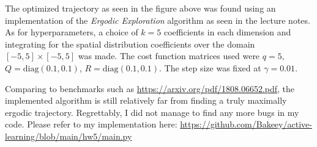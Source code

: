 The optimized trajectory as seen in the figure above was found using an implementation of the \textit{Ergodic Exploration} algorithm as seen in the lecture notes.
As for hyperparameters, a choice of $k=5$ coefficients in each dimension and integrating for the spatial distribution coefficients over the domain $[-5,5]\times[-5,5]$ was made. 
The cost function matrices used were $q=5$, $Q=\textrm{diag}(0.1,0.1)$, $R=\textrm{diag}(0.1,0.1)$. The step size was fixed at $\gamma = 0.01.$

Comparing to benchmarks such as \url{https://arxiv.org/pdf/1808.06652.pdf}, the implemented algorithm is still relatively far from finding a truly maximally ergodic trajectory. 
Regrettably, I did not manage to find any more bugs in my code. Please refer to my implementation here: \url{https://github.com/Bakeey/active-learning/blob/main/hw5/main.py}